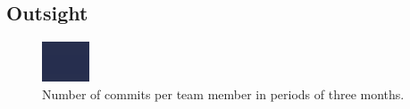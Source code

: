 \documentclass[10pt]{book}
\begin{document}
\subsection{Outsight}\label{sec:outsight}
\begin{figure}[htbp]
\begin{center}
\includegraphics[width=\columnwidth]{commit-histogram}
\caption{Number of commits per team member in periods of three months.}
\label{fig:histogram}
\end{center}
\end{figure}
\end{document}
